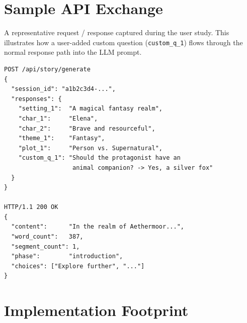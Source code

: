 \begin{appendices}
\chapter{Sample API Exchange}

A representative request / response captured during the user study.
This illustrates how a user-added custom question
(\texttt{custom\_q\_1}) flows through the normal response path into
the LLM prompt.

\begin{lstlisting}
POST /api/story/generate
{
  "session_id": "a1b2c3d4-...",
  "responses": {
    "setting_1":  "A magical fantasy realm",
    "char_1":     "Elena",
    "char_2":     "Brave and resourceful",
    "theme_1":    "Fantasy",
    "plot_1":     "Person vs. Supernatural",
    "custom_q_1": "Should the protagonist have an
                   animal companion? -> Yes, a silver fox"
  }
}

HTTP/1.1 200 OK
{
  "content":      "In the realm of Aethermoor...",
  "word_count":   387,
  "segment_count": 1,
  "phase":        "introduction",
  "choices": ["Explore further", "..."]
}
\end{lstlisting}

\chapter{Implementation Footprint}


\end{appendices}
